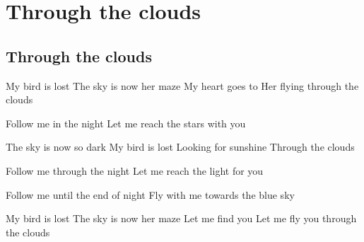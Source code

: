 \documentclass{article}
\newenvironment{album}[1]%
{%
  \section*{#1}
}%
{%
}
\newenvironment{song}[1]%
{%
  \subsection*{\textbf{#1}}
  \begin{multicols*}{2}
}%
{%
  \end{multicols*}
  \newpage
}
\newenvironment{couplet} %
{%
  \verbatim
}%
{% end code
  \endverbatim
}
\newenvironment{refrain} %
{%
  \verbatim
}%
{% end code
  \endverbatim
}
\newenvironment{pont} %
{%
  \verbatim
}%
{% end code
  \endverbatim
}
\begin{document}
\begin{album}{Through the clouds}
\begin{song}{Through the clouds}
\begin{couplet}
My bird is lost
The sky is now her maze
My heart goes to
Her flying through the clouds
\end{couplet}
\begin{refrain}
Follow me in the night
Let me reach the stars with you
\end{refrain}  
\begin{couplet}
The sky is now so dark
My bird is lost
Looking for sunshine
Through the clouds  
\end{couplet}
\begin{refrain}
Follow me through the night
Let me reach the light for you  
\end{refrain}
\begin{pont}
Follow me until the end of night
Fly with me towards the blue sky  
\end{pont}
\begin{couplet}
My bird is lost
The sky is now her maze
Let me find you
Let me fly you through the clouds  
\end{couplet}
\end{song}


\end{album}
\end{document}
